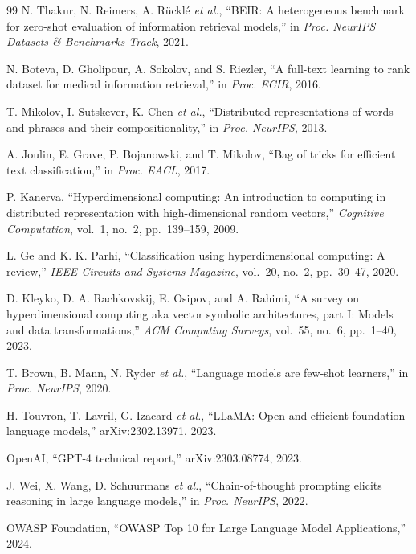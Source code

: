 \documentclass[conference]{IEEEtran}
\begin{document}
\begin{thebibliography}{99}
N. Thakur, N. Reimers, A. R\"uckl\'e \emph{et al.},
``BEIR: A heterogeneous benchmark for zero-shot evaluation of
information retrieval models,'' in \emph{Proc. NeurIPS Datasets
\& Benchmarks Track}, 2021.

N. Boteva, D. Gholipour, A. Sokolov, and S. Riezler,
``A full-text learning to rank dataset for medical information
retrieval,'' in \emph{Proc. ECIR}, 2016.

T. Mikolov, I. Sutskever, K. Chen \emph{et al.},
``Distributed representations of words and phrases and their
compositionality,'' in \emph{Proc. NeurIPS}, 2013.

A. Joulin, E. Grave, P. Bojanowski, and T. Mikolov,
``Bag of tricks for efficient text classification,''
in \emph{Proc. EACL}, 2017.

P. Kanerva,
``Hyperdimensional computing: An introduction to computing in
distributed representation with high-dimensional random vectors,''
\emph{Cognitive Computation}, vol.~1, no.~2, pp.~139--159, 2009.

L. Ge and K. K. Parhi,
``Classification using hyperdimensional computing: A review,''
\emph{IEEE Circuits and Systems Magazine}, vol.~20, no.~2,
pp.~30--47, 2020.

D. Kleyko, D. A. Rachkovskij, E. Osipov, and A. Rahimi,
``A survey on hyperdimensional computing aka vector symbolic
architectures, part I: Models and data transformations,''
\emph{ACM Computing Surveys}, vol.~55, no.~6, pp.~1--40, 2023.

T. Brown, B. Mann, N. Ryder \emph{et al.},
``Language models are few-shot learners,'' in \emph{Proc.
NeurIPS}, 2020.

H. Touvron, T. Lavril, G. Izacard \emph{et al.},
``LLaMA: Open and efficient foundation language models,''
arXiv:2302.13971, 2023.

OpenAI, ``GPT-4 technical report,'' arXiv:2303.08774, 2023.

J. Wei, X. Wang, D. Schuurmans \emph{et al.},
``Chain-of-thought prompting elicits reasoning in large language
models,'' in \emph{Proc. NeurIPS}, 2022.

OWASP Foundation, ``OWASP Top 10 for Large Language Model
Applications,'' 2024.


\end{thebibliography}
\end{document}
